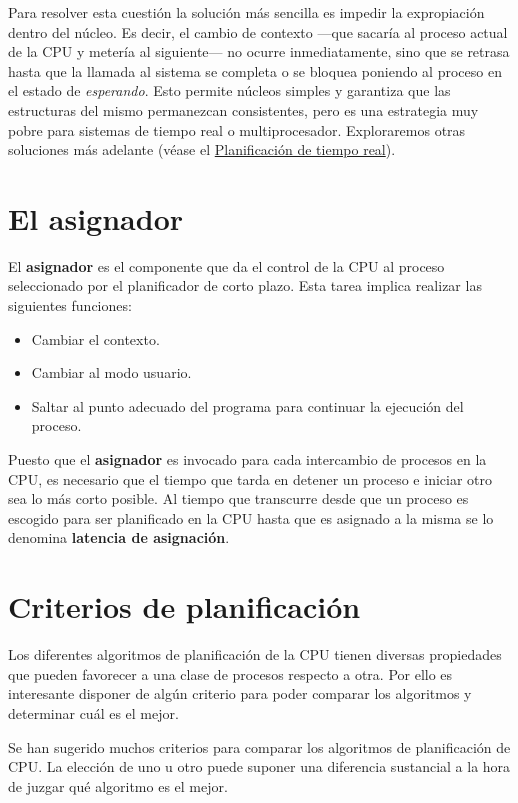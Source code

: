 Para resolver esta cuestión la solución más sencilla es impedir la
expropiación dentro del núcleo. Es decir, el cambio de contexto ---que
sacaría al proceso actual de la CPU y metería al siguiente--- no ocurre
inmediatamente, sino que se retrasa hasta que la llamada al sistema se
completa o se bloquea poniendo al proceso en el estado de
\emph{esperando}. Esto permite núcleos simples y garantiza que las
estructuras del mismo permanezcan consistentes, pero es una estrategia
muy pobre para sistemas de tiempo real o multiprocesador. Exploraremos
otras soluciones más adelante (véase el
\hyperref[_planificaciuxf3n_de_tiempo_real]{Planificación de tiempo
real}).

\section{El asignador}\label{_el_asignador}

El \textbf{{}asignador} es el componente que da el control de la CPU al
proceso seleccionado por el planificador de corto plazo. Esta tarea
implica realizar las siguientes funciones:

\begin{itemize}
\item
  Cambiar el contexto.
\item
  Cambiar al modo usuario.
\item
  Saltar al punto adecuado del programa para continuar la ejecución del
  proceso.
\end{itemize}

Puesto que el \textbf{asignador} es invocado para cada intercambio de
procesos en la CPU, es necesario que el tiempo que tarda en detener un
proceso e iniciar otro sea lo más corto posible. Al tiempo que
transcurre desde que un proceso es escogido para ser planificado en la
CPU hasta que es asignado a la misma se lo denomina \textbf{latencia de
asignación}{}.

\section{Criterios de
planificación}\label{_criterios_de_planificaciuxf3n}

Los diferentes algoritmos de planificación de la CPU tienen diversas
propiedades que pueden favorecer a una clase de procesos respecto a
otra. Por ello es interesante disponer de algún criterio para poder
comparar los algoritmos y determinar cuál es el mejor.

Se han sugerido muchos criterios para comparar los algoritmos de
planificación de CPU. La elección de uno u otro puede suponer una
diferencia sustancial a la hora de juzgar qué algoritmo es el mejor.

